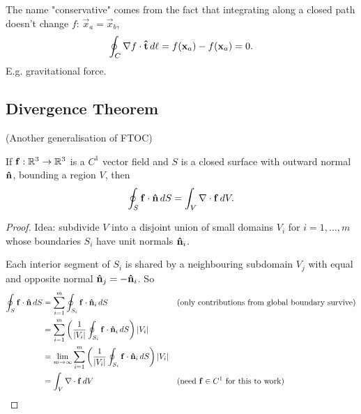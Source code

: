 \documentclass[10pt, a4paper]{article}
\begin{document}
\begin{remark}
    The name "conservative" comes from the fact that integrating along a closed path doesn't change $f$:
    $\vec{x}_a = \vec{x}_b$,
    \[
    \oint_{C}\mathbf{\nabla} f \cdot \mathbf{\hat{t}}\,d\ell = f(\mathbf{x}_a) - f(\mathbf{x}_a) = 0.
    \]
    E.g. gravitational force.
\end{remark}

\subsection{Divergence Theorem}
(Another generalisation of FTOC)

\begin{theorem}
    If $\mathbf{f} : \mathbb{R} ^ 3 \to \mathbb{R} ^ 3$ is a $C ^ {1}$ vector field and $S$ is a closed surface with outward normal $\mathbf{\hat{n}}$,
    bounding a region $V$,
    then
    \[
    \oint_{S}\mathbf{f}\cdot\mathbf{\hat{n}}\,dS = \int_{V}\mathbf{\nabla} \cdot \mathbf{f}\,dV.
    \]

    \begin{proof}
        Idea:
        subdivide $V$ into a disjoint union of small domains $V_i$ for $i = 1, \dotsc, m$
        whose boundaries $S_i$ have unit normals $\mathbf{\hat{n}}_i$.

        Each interior segment of $S_i$ is shared by a neighbouring subdomain $V_j$ with equal and opposite normal $\mathbf{\hat{n}}_j = -\mathbf{\hat{n}}_i$.
        So
        \begin{align*}
            \oint_{S}\mathbf{f}\cdot\mathbf{\hat{n}}\,dS &= \sum_{i = 1}^{m}\oint_{S_i}\mathbf{f}\cdot\mathbf{\hat{n}}_i\,dS &&(\text{only contributions from global boundary survive}) \\
            &= \sum_{i = 1}^{m}\left(\frac{1}{|V_i|}\oint_{S_i}\mathbf{f}\cdot\mathbf{\hat{n}}_i\,dS\right)|V_i| \\
            &= \lim_{m \to \infty}\sum_{i = 1}^{m}\left(\frac{1}{|V_i|}\oint_{S_i}\mathbf{f}\cdot\mathbf{\hat{n}}_i\,dS\right)|V_i| \\
            &= \int_{V}\mathbf{\nabla}\cdot\mathbf{f}\,dV &&(\text{need $\mathbf{f} \in C ^ {1}$ for this to work})
        \end{align*}
        \[
        \]
    \end{proof}
\end{theorem}
\end{document}
